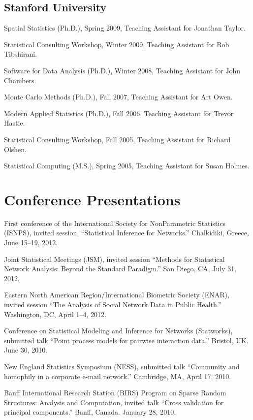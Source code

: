 \documentclass[10pt,letterpaper]{article}
\renewenvironment{itemize}{
  \begin{list}{}{
    \setlength{\leftmargin}{1.5em}
    \setlength{\itemsep}{0.25em}
    \setlength{\parskip}{0pt}
    \setlength{\parsep}{0.25em}
  }
}{
  \end{list}
}
\begin{document}
\subsection*{Stanford University}

\begin{itemize}
\item Spatial Statistics (Ph.D.), Spring 2009, Teaching Assistant for Jonathan Taylor.
\item Statistical Consulting Workshop, Winter 2009, Teaching Assistant for Rob Tibshirani.
\item Software for Data Analysis (Ph.D.), Winter 2008, Teaching Assistant for John Chambers.
\item Monte Carlo Methods (Ph.D.), Fall 2007, Teaching Assistant for Art Owen.
\item Modern Applied Statistics (Ph.D.), Fall 2006, Teaching Assistant for Trevor Hastie.
\item Statistical Consulting Workshop, Fall 2005, Teaching Assistant for Richard Olshen.
\item Statistical Computing (M.S.), Spring 2005, Teaching Assistant for Susan Holmes.
\end{itemize}

\section*{Conference Presentations}
\begin{itemize}
\item First conference of the International Society for NonParametric
Statistics (ISNPS), invited session, ``Statistical Inference for Networks.'' Chalkidiki, Greece, June 15--19, 2012.
\item Joint Statistical Meetings (JSM), invited session ``Methods for Statistical Network Analysis: Beyond the Standard Paradigm.'' 
    San Diego, CA, July 31, 2012.
\item Eastern North American Region/International Biometric Society (ENAR), invited session ``The Analysis of Social Network Data in Public Health.''
    Washington, DC, April 1--4, 2012.
\item Conference on Statistical Modeling and Inference for Networks (Statworks), submitted talk
  ``Point process models for pairwise interaction data.''
  Bristol, UK.  June 30, 2010.
\item New England Statistics Symposium (NESS), submitted talk
  ``Community and homophily in a corporate e-mail network.''
  Cambridge, MA, April 17, 2010.
\item Banff International Research Station (BIRS)
  Program on Sparse Random Structures: Analysis and Computation,
  invited talk ``Cross validation for principal components.''
  Banff, Canada.  January 28, 2010.
\end{itemize}
\end{document}
